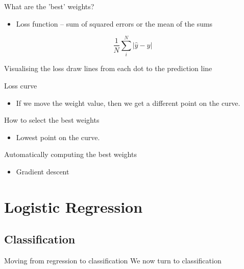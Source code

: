 \documentclass[10pt]{beamer}
\begin{document}
\begin{frame}[label={sec:org307f260}]{What are the 'best' weights?}
\begin{itemize}
\item Loss function -- sum of squared errors or the mean of the sums
\end{itemize}

\[  \frac{1}{N} \sum_i^N | \hat{y} - y | \]
\end{frame}

\begin{frame}[label={sec:org769e485}]{Visualising the loss}
\alert{draw lines from each dot to the prediction line}
\end{frame}

\begin{frame}[label={sec:org553525e}]{Loss curve}
\begin{itemize}
\item If we move the weight value, then we get a different point on the curve.
\end{itemize}
\end{frame}

\begin{frame}[label={sec:org85d3a4f}]{How to select the best weights}
\begin{itemize}
\item Lowest point on the curve.
\end{itemize}
\end{frame}

\begin{frame}[label={sec:orgbbb5508}]{Automatically computing the best weights}
\begin{itemize}
\item Gradient descent
\end{itemize}
\end{frame}

\section*{Logistic Regression}
\label{sec:orge7991d1}

\subsection*{Classification}
\label{sec:org368d2c7}

\begin{frame}[label={sec:orgb479203}]{Moving from regression to classification}
We now turn to classification
\end{frame}
\end{document}
